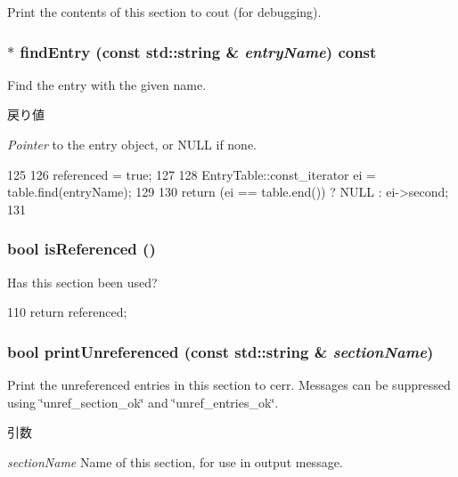 Print the contents of this section to cout (for debugging). \hypertarget{classIniFile_1_1Section_afe23112a92c3a94832ec63c369cd7b95}{
\subsubsection[{findEntry}]{ $\ast$ findEntry (const std::string \& {\em entryName}) const}}
\label{classIniFile_1_1Section_afe23112a92c3a94832ec63c369cd7b95}
Find the entry with the given name. 
\begin{DoxyRetVals}{戻り値}
\item[{\em Pointer}]to the entry object, or NULL if none. \end{DoxyRetVals}



\begin{DoxyCode}
125 {
126     referenced = true;
127 
128     EntryTable::const_iterator ei = table.find(entryName);
129 
130     return (ei == table.end()) ? NULL : ei->second;
131 }
\end{DoxyCode}
\hypertarget{classIniFile_1_1Section_a9bb33643f50132c7eb254763f4509d23}{
\subsubsection[{isReferenced}]{\setlength{\rightskip}{0pt plus 5cm}bool isReferenced ()}}
\label{classIniFile_1_1Section_a9bb33643f50132c7eb254763f4509d23}


Has this section been used? 


\begin{DoxyCode}
110 { return referenced; }
\end{DoxyCode}
\hypertarget{classIniFile_1_1Section_a0be8fad0417aca3b37c8b95877552a39}{
\subsubsection[{printUnreferenced}]{\setlength{\rightskip}{0pt plus 5cm}bool printUnreferenced (const std::string \& {\em sectionName})}}
\label{classIniFile_1_1Section_a0be8fad0417aca3b37c8b95877552a39}
Print the unreferenced entries in this section to cerr. Messages can be suppressed using \char`\"{}unref\_\-section\_\-ok\char`\"{} and \char`\"{}unref\_\-entries\_\-ok\char`\"{}. 
\begin{DoxyParams}{引数}
\item[{\em sectionName}]Name of this section, for use in output message. \end{DoxyParams}

